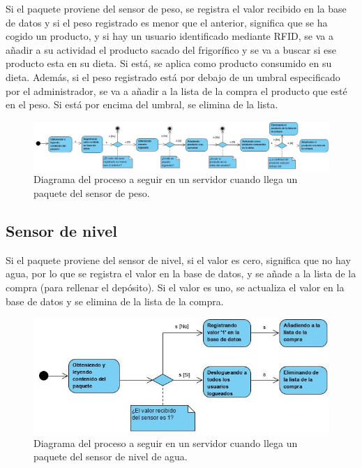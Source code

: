 Si el paquete proviene del sensor de peso, se registra el valor recibido en la base de datos y si el peso registrado es menor que el anterior, significa que se ha cogido un producto, y si hay un usuario identificado mediante RFID, se va a añadir a su actividad el producto sacado del frigorífico y se va a buscar si ese producto esta en su dieta. Si está, se aplica como producto consumido en su dieta. Además, si el peso registrado está por debajo de un umbral especificado por el administrador, se va a añadir a la lista de la compra el producto que esté en el peso. Si está por encima del umbral, se elimina de la lista.

\begin{figure}[h]
    \centering
    \includegraphics[width=\textwidth]{capitulos/capitulo7/diagramaPesoServer.jpg}
    \caption{Diagrama del proceso a seguir en un servidor cuando llega un paquete del sensor de peso.}
    \label{fig:diagramapesoserver}
\end{figure}

\subsection{Sensor de nivel}

Si el paquete proviene del sensor de nivel, si el valor es cero, significa que no hay agua, por lo que se registra el valor en la base de datos, y se añade a la lista de la compra (para rellenar el depósito). Si el valor es uno, se actualiza el valor en la base de datos y se elimina de la lista de la compra.

\begin{figure}[h]
    \centering
    \includegraphics[width=.60\textwidth]{capitulos/capitulo7/diagramaNivelServer.jpg}
    \caption{Diagrama del proceso a seguir en un servidor cuando llega un paquete del sensor de nivel de agua.}
    \label{fig:diagramaaguaserver}
\end{figure}

